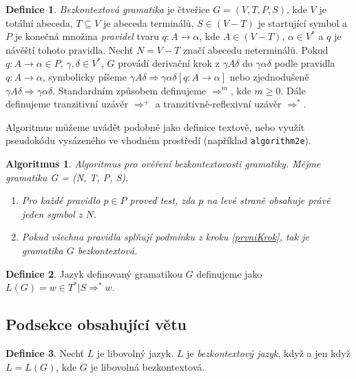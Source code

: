 \documentclass[11pt, a4paper, twocolumn]{article}
\theoremstyle{definition}
\newtheorem{definice}{Definice}[section]
\theoremstyle{plain}
\newtheorem{algoritmus}{Algoritmus}[section]
\begin{document}
	\begin{definice}
	\emph{Bezkontextová gramatika} je čtveřice $G=(V,T,P,S)$, kde $V$ je totální abeceda,
	$T \subseteq V$ je abeceda terminálů, $S \in (V-T)$ je startující symbol a $P$ je konečná množina \emph{pravidel} tvaru $q: A \rightarrow \alpha$, kde $A \in (V - T)$, $\alpha \in V^*$ a $q$ je návěští tohoto pravidla. Nechť $N = V - T$ značí abecedu neterminálů.
	Pokud $q: A \rightarrow \alpha \in P$, $\gamma,\delta \in V^*$, $G$ provádí derivační krok z $\gamma A \delta$ do $\gamma \alpha \delta$ podle pravidla $q: A \rightarrow \alpha$, symbolicky píšeme $\gamma A \delta \Rightarrow \gamma \alpha \delta [q: A \rightarrow \alpha]$ nebo zjednodušeně $\gamma A \delta \Rightarrow \gamma \alpha \delta$. Standardním způsobem definujeme $\Rightarrow^m$, kde $m \geq 0$. Dále definujeme tranzitivní uzávěr $\Rightarrow^+$ a tranzitivně-reflexivní uzávěr $\Rightarrow^*$.
	\end{definice}

	Algoritmus můžeme uvádět podobně jako definice textově, nebo využít pseudokódu vysázeného ve vhodném prostředí (například \texttt{algorithm2e}).

	\begin{algoritmus}
	Algoritmus pro ověření bezkontextovosti gramatiky. Mějme gramatiku G = (N, T, P, S).
		\begin{enumerate}
	 		\item \label{prvniKrok} Pro každé pravidlo $p \in P$ proveď test, zda $p$ na levé straně obsahuje právě jeden symbol z $N$.
	 		\item Pokud všechna pravidla splňují podmínku z kroku \ref{prvniKrok}, tak je gramatika $G$ bezkontextová.
	 	\end{enumerate}
	\end{algoritmus}

	\begin{definice}
	Jazyk definovaný gramatikou $G$ definujeme jako $L(G) = {w \in T^*|S \Rightarrow^* w}$.
	\end{definice}

	\subsection{Podsekce obsahující větu}

	\begin{definice}
	Nechť $L$ je libovolný jazyk. $L$ je \emph{bezkontextový jazyk}, když a jen když $L = L(G)$, kde $G$ je libovolná bezkontextová.
	\end{definice}
\end{document}
